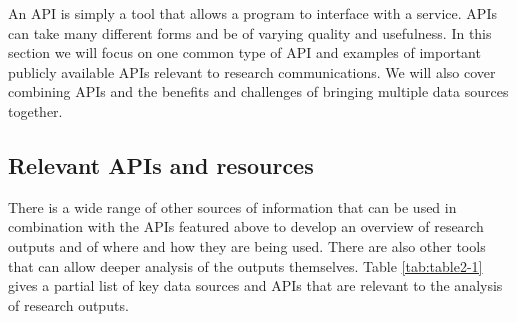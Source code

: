 \documentclass[]{krantz}
\begin{document}
An API is simply a tool that allows a program to interface with a
service. APIs can take many different forms and be of varying quality
and usefulness. In this section we will focus on one common type of API
and examples of important publicly available APIs relevant to research
communications. We will also cover combining APIs and the benefits and
challenges of bringing multiple data sources together.

\subsection{Relevant APIs and resources}\label{sec:4-3.1}

There is a wide range of other sources of information that can be used
in combination with the APIs featured above to develop an overview of
research outputs and of where and how they are being used. There are
also other tools that can allow deeper analysis of the outputs
themselves. Table \ref{tab:table2-1} gives a partial list of key data
sources and APIs that are relevant to the analysis of research outputs.
\end{document}
